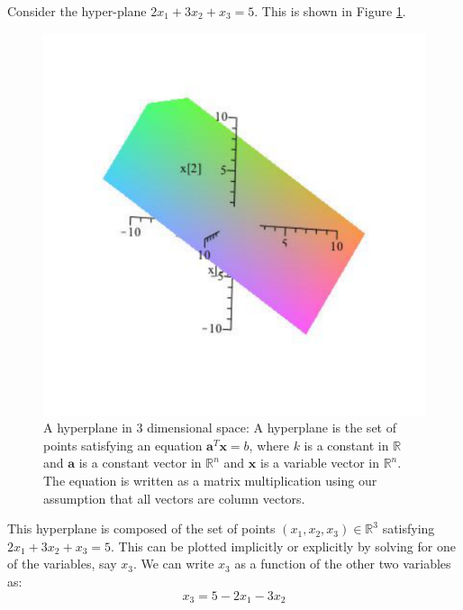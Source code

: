 \begin{example} Consider the hyper-plane $2x_1 + 3x_2 + x_3 = 5$. This is shown in Figure \ref{fig:HyperPlane}.
\begin{figure}[htbp]
\centering
\includegraphics[scale=0.5]{HyperPlane.pdf}
\caption{A hyperplane in 3 dimensional space: A hyperplane is the set of points satisfying an equation $\mathbf{a}^T\mathbf{x} = b$, where $k$ is a constant in $\mathbb{R}$ and $\mathbf{a}$ is a constant vector in $\mathbb{R}^n$ and $\mathbf{x}$ is a variable vector in $\mathbb{R}^n$. The equation is written as a matrix multiplication using our assumption that all vectors are column vectors.}
\label{fig:HyperPlane}
\end{figure}
This hyperplane is composed of the set of points $(x_1,x_2,x_3) \in \mathbb{R}^3$ satisfying $2x_1 + 3x_2 + x_3 = 5$. This can be plotted implicitly or explicitly by solving for one of the variables, say $x_3$. We can write $x_3$ as a function of the other two variables as: 
\begin{equation}
x_3 = 5 - 2x_1 - 3x_2
\end{equation}
\end{example}

